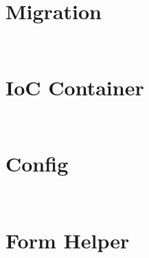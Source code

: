 \begin{lstlisting}[language=PHP]

\end{lstlisting}

\chapter{Migration}


\begin{lstlisting}[language=PHP]

\end{lstlisting}




\begin{lstlisting}[language=PHP]

\end{lstlisting}


\chapter{IoC Container}

\begin{lstlisting}[language=PHP]

\end{lstlisting}



\begin{lstlisting}[language=PHP]

\end{lstlisting}

\chapter{Config}


\begin{lstlisting}[language=PHP]

\end{lstlisting}



\begin{lstlisting}[language=PHP]

\end{lstlisting}

\chapter{Form Helper}

\begin{lstlisting}[language=PHP]

\end{lstlisting}



